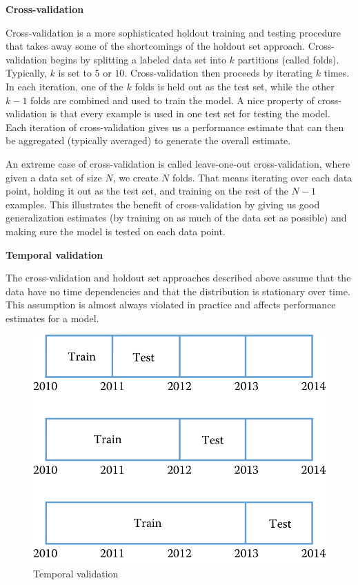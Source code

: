 \documentclass[]{krantz}
\begin{document}
\textbf{Cross-validation}

Cross-validation is a more sophisticated holdout training and testing
procedure that takes away some of the shortcomings of the holdout set
approach. Cross-validation begins by splitting a labeled data set into
\(k\) partitions (called folds). Typically, \(k\) is set to \(5\) or
\(10\). Cross-validation then proceeds by iterating \(k\) times. In each
iteration, one of the \(k\) folds is held out as the test set, while the
other \(k-1\) folds are combined and used to train the model. A nice
property of cross-validation is that every example is used in one test
set for testing the model. Each iteration of cross-validation gives us a
performance estimate that can then be aggregated (typically averaged) to
generate the overall estimate.

An extreme case of cross-validation is called leave-one-out
cross-validation, where given a data set of size \(N\), we create \(N\)
folds. That means iterating over each data point, holding it out as the
test set, and training on the rest of the \(N-1\) examples. This
illustrates the benefit of cross-validation by giving us good
generalization estimates (by training on as much of the data set as
possible) and making sure the model is tested on each data point.

\textbf{Temporal validation}

\hspace*{4pt} The cross-validation and holdout set approaches described
above assume that the data have no time dependencies and that the
distribution is stationary over time. This assumption is almost always
violated in practice and affects performance estimates for a model.

\begin{figure}

{\centering \includegraphics[width=0.7\linewidth]{ChapterML/figures/temporal} 

}

\caption{Temporal validation}\label{fig:temporal}
\end{figure}
\end{document}
